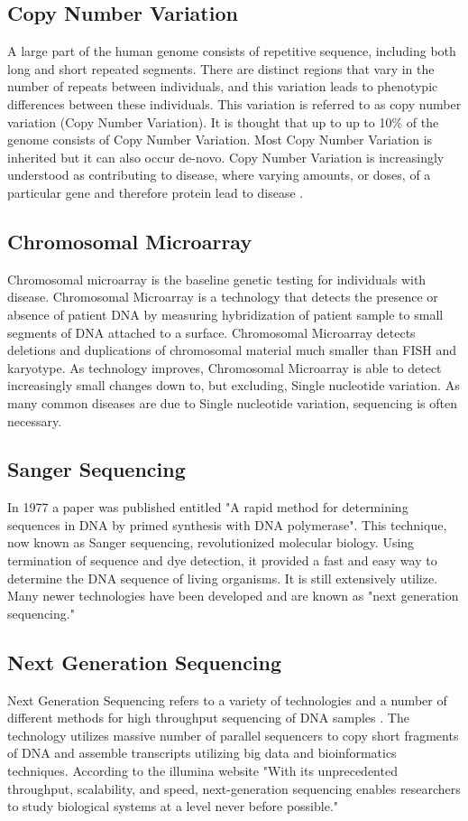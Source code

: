\documentclass[sigconf]{acmart}
\begin{document}
\subsection{Copy Number Variation}
A large part of the human genome consists of repetitive sequence, including both long and short repeated segments.  There are distinct regions that vary in the number of repeats between individuals, and this variation leads to phenotypic differences between these individuals.  This variation is referred to as copy number variation (Copy Number Variation).   It is thought that up to up to 10\% of the genome consists of Copy Number Variation.  Most Copy Number Variation is inherited but it can also occur de-novo.  Copy Number Variation is increasingly understood as contributing to disease, where varying amounts, or doses, of a particular gene and therefore protein lead to disease \cite{zhang2009copy}.   

\subsection{Chromosomal Microarray}
Chromosomal microarray is the baseline genetic testing for individuals with disease. Chromosomal Microarray is a technology that detects the presence or absence of patient DNA by measuring hybridization of patient sample to small segments of DNA attached to a surface.  Chromosomal Microarray detects deletions and duplications of chromosomal material much smaller than FISH and karyotype.  As technology improves, Chromosomal Microarray is able to detect increasingly small changes down to, but excluding, Single nucleotide variation.  As many common diseases are due to Single nucleotide variation, sequencing is often necessary. \cite{wapner2012chromosomal}

\subsection{Sanger Sequencing}
In 1977 a paper was published entitled "A rapid method for determining sequences in DNA by primed synthesis with DNA polymerase".  This technique, now known as Sanger sequencing, revolutionized molecular biology.  Using termination of sequence and dye detection, it provided a fast and easy way to determine the DNA sequence of living organisms. It is still extensively utilize. Many newer technologies have been developed and are known as "next generation sequencing." \cite{schuster2008next}   

\subsection{Next Generation Sequencing}
Next Generation Sequencing refers to a variety of technologies and a number of different methods for high throughput sequencing of DNA samples \cite{reis2009next}.  The technology utilizes massive number of parallel sequencers to copy short fragments of DNA and assemble transcripts utilizing big data and bioinformatics techniques.  According to the illumina website "With its unprecedented throughput, scalability, and speed, next-generation sequencing enables researchers to study biological systems at a level never before possible."
\end{document}
